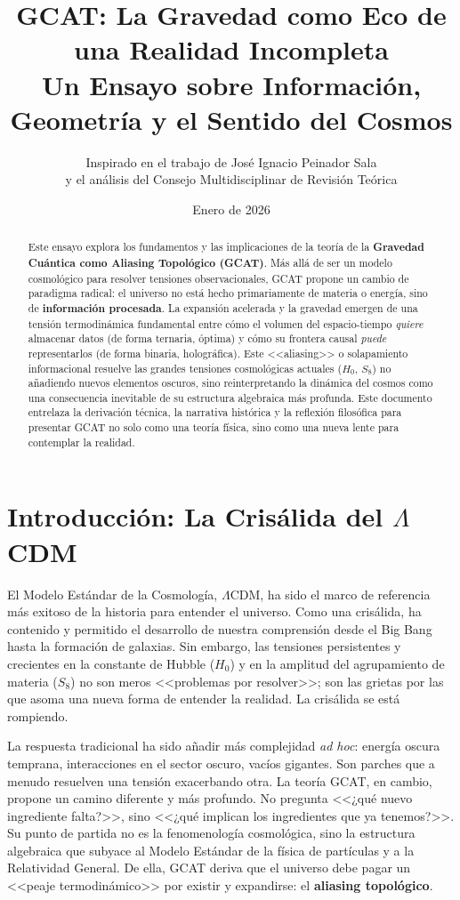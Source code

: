 \documentclass[12pt, a4paper]{article}
\title{\textbf{GCAT: La Gravedad como Eco de una Realidad Incompleta} \\ Un Ensayo sobre Información, Geometría y el Sentido del Cosmos}
\author{Inspirado en el trabajo de José Ignacio Peinador Sala \\ y el análisis del Consejo Multidisciplinar de Revisión Teórica}
\date{Enero de 2026}
\begin{document}
\maketitle

\begin{abstract}
\noindent
Este ensayo explora los fundamentos y las implicaciones de la teoría de la \textbf{Gravedad Cuántica como Aliasing Topológico (GCAT)}. Más allá de ser un modelo cosmológico para resolver tensiones observacionales, GCAT propone un cambio de paradigma radical: el universo no está hecho primariamente de materia o energía, sino de \textbf{información procesada}. La expansión acelerada y la gravedad emergen de una tensión termodinámica fundamental entre cómo el volumen del espacio-tiempo \textit{quiere} almacenar datos (de forma ternaria, óptima) y cómo su frontera causal \textit{puede} representarlos (de forma binaria, holográfica). Este <<aliasing>> o solapamiento informacional resuelve las grandes tensiones cosmológicas actuales ($H_0$, $S_8$) no añadiendo nuevos elementos oscuros, sino reinterpretando la dinámica del cosmos como una consecuencia inevitable de su estructura algebraica más profunda. Este documento entrelaza la derivación técnica, la narrativa histórica y la reflexión filosófica para presentar GCAT no solo como una teoría física, sino como una nueva lente para contemplar la realidad.
\end{abstract}

\section{Introducción: La Crisálida del \texorpdfstring{$\Lambda$}{Lambda}CDM}

El Modelo Estándar de la Cosmología, $\Lambda$CDM, ha sido el marco de referencia más exitoso de la historia para entender el universo. Como una crisálida, ha contenido y permitido el desarrollo de nuestra comprensión desde el Big Bang hasta la formación de galaxias. Sin embargo, las tensiones persistentes y crecientes en la constante de Hubble ($H_0$) y en la amplitud del agrupamiento de materia ($S_8$) no son meros <<problemas por resolver>>; son las grietas por las que asoma una nueva forma de entender la realidad. La crisálida se está rompiendo.

La respuesta tradicional ha sido añadir más complejidad \textit{ad hoc}: energía oscura temprana, interacciones en el sector oscuro, vacíos gigantes. Son parches que a menudo resuelven una tensión exacerbando otra. La teoría GCAT, en cambio, propone un camino diferente y más profundo. No pregunta <<¿qué nuevo ingrediente falta?>>, sino <<¿qué implican los ingredientes que ya tenemos?>>. Su punto de partida no es la fenomenología cosmológica, sino la estructura algebraica que subyace al Modelo Estándar de la física de partículas y a la Relatividad General. De ella, GCAT deriva que el universo debe pagar un <<peaje termodinámico>> por existir y expandirse: el \textbf{aliasing topológico}.
\end{document}
